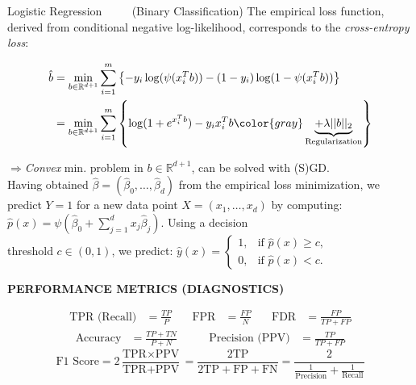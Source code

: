 \documentclass[a4paper,10pt]{article}
\def\R{\mathbb{R}}
\newcommand{\subtitle}[1]{\vspace{0.25cm}\begin{normalsize}\textbf{\textcolor{gray!150}{\uppercase{#1}}}\end{normalsize}}
\begin{document}
\begin{small}
\begin{subbox}{Logistic Regression $\quad \quad$ (Binary Classification)}
    The empirical loss function, derived from conditional negative log-likelihood, corresponds to the \textit{cross-entropy loss}:
    
    \begin{align*}
    \hat{b} & = \min_{b \in \mathbb{R}^{d+1}} \sum_{i=1}^{m} \left\{ -y_i \log(\psi(x_i^T b)) - (1 - y_i) \log(1 - \psi(x_i^T b)) \right\} \\ 
    & = \min_{b \in \mathbb{R}^{d+1}} \sum_{i=1}^{m} \left\{ \log(1 + e^{x_i^T b}) - y_i x_i^T b  \begingroup \color{gray} \underbrace{ + \lambda ||b||_2}_{\text{Regularization}}  \endgroup \right \}
    \end{align*}

\end{subbox}

$\Rightarrow$\textit{Convex} min. problem in $b \in \R^{d+1}$, can be solved with (S)GD. \\

Having obtained $\hat{\beta} = (\hat{\beta}_0, \dots, \hat{\beta}_d)$ from the empirical loss minimization, we predict $Y = 1$ for a new data point $X = (x_1, \dots, x_d)$ by computing:
$
\hat{p}(x) = \psi\left( \hat{\beta}_0 + \sum_{j=1}^{d} x_j \hat{\beta}_j \right).
$
Using a decision \\ threshold $c \in (0, 1)$, we predict:
$
\hat{y}(x) = \begin{cases}
1, & \text{if } \hat{p}(x) \geq c, \\
0, & \text{if } \hat{p}(x) < c.
\end{cases}
$



\subtitle{Performance Metrics (Diagnostics)}  
\vspace{-0.2cm} %
\begin{align*}
\text{TPR (Recall)}&=\frac{TP}{P} \quad &  \text{FPR}&=\frac{FP}{N} \quad & \text{FDR}&=\frac{FP}{TP+FP}
\end{align*}
\begin{align*}
\text{Accuracy}&=\frac{TP + TN}{P+N} \quad \quad    &  \text{Precision (PPV)}&=\frac{TP}{TP+FP}            
\end{align*}
$$
\text{F1 Score} = 2 \frac{\text{TPR} \times \text{PPV}}{\text{TPR} + \text{PPV}} = \frac{2 \text{TP}}{2 \text{TP} + \text{FP} + \text{FN}} = \frac{2}{\frac{1}{\text{Precision}} + \frac{1}{\text{Recall}}}
$$


\end{small}
\end{document}
